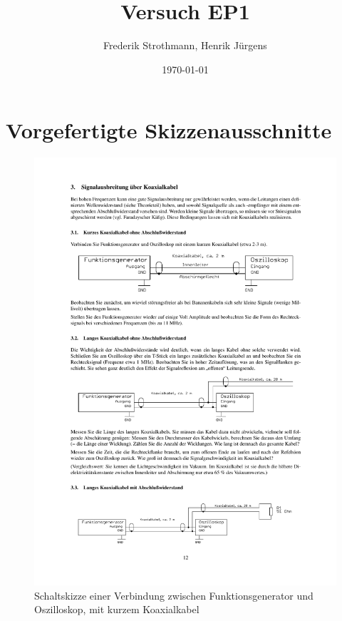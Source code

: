 \documentclass[12pt,a4paper]{article}
\title{Versuch EP1}
\author{Frederik Strothmann, Henrik Jürgens}
\date{\today}
\begin{document}
\maketitle
\newpage
\tableofcontents
\newpage

\section*{Vorgefertigte Skizzenausschnitte}




\begin{figure}[H] 
  \centering
    \includegraphics[trim = 10mm 200mm 10mm 65mm, clip, scale = 1]{3-3_3.pdf}
  	\caption[Schaltskizze einer Verbindung zwischen Funktionsgenerator und Oszilloskop, mit kurzem Koaxialkabel]{Schaltskizze einer Verbindung zwischen Funktionsgenerator und Oszilloskop, mit kurzem Koaxialkabel\footnotemark}
  \label{fig:3.1}
\end{figure}
\end{document}
